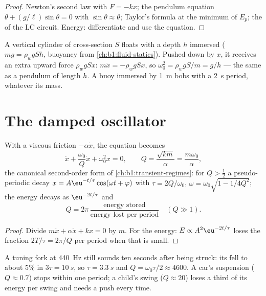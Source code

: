 \begin{proof}
Newton's second law with $F = -kx$; the pendulum equation
$\ddot\theta + (g/\ell)\sin\theta = 0$ with $\sin\theta \approx \theta$;
Taylor's formula at the minimum of $E_p$; the  of the LC
circuit. Energy: differentiate and use the equation.
\end{proof}

\begin{example}\label{ex:b1:oscillators-resonance:bob}
A vertical cylinder of cross-section $S$ floats with a depth $h$
immersed ($mg = \rho_wgSh$, buoyancy from \cref{ch:b1:fluid-statics}).
Pushed down by $x$, it receives an extra upward force $\rho_wgSx$:
$m\ddot x = -\rho_wgSx$, so $\omega_0^2 = \rho_wgS/m = g/h$ --- the same
as a pendulum of length $h$. A buoy immersed by \qty{1}{m} bobs with a
\qty{2}{s} period, whatever its mass.
\end{example}

\section{The damped oscillator}

\begin{proposition}\label{prop:b1:oscillators-resonance:damped}
With a viscous friction $-\alpha\dot x$, the equation becomes
\[
\ddot x + \frac{\omega_0}{Q}\dot x + \omega_0^2x = 0, \qquad
Q = \frac{\sqrt{km}}{\alpha} = \frac{m\omega_0}{\alpha},
\]
the canonical second-order form of \cref{ch:b1:transient-regimes}: for
$Q > \tfrac12$ a pseudo-periodic decay $x = A\eu^{-t/\tau}\cos(\omega t +
\varphi)$ with $\tau = 2Q/\omega_0$, $\omega = \omega_0\sqrt{1 - 1/4Q^2}$; the
energy decays as $\eu^{-2t/\tau}$ and
\[
Q = 2\pi\,\frac{\text{energy stored}}{\text{energy lost per period}}
\quad (Q \gg 1) .
\]
\end{proposition}

\begin{proof}
Divide $m\ddot x + \alpha\dot x + kx = 0$ by $m$. For the energy: $E
\propto A^2\eu^{-2t/\tau}$ loses the fraction $2T/\tau = 2\pi/Q$ per
period when that is small.
\end{proof}

\begin{example}\label{ex:b1:oscillators-resonance:ringing}
A tuning fork at \qty{440}{Hz} still sounds ten seconds after being
struck: its  fell to about $5\%$ in $3\tau = \qty{10}{s}$, so
$\tau = \qty{3.3}{s}$ and $Q = \omega_0\tau/2 \approx 4600$. A car's
suspension ($Q \approx 0.7$) stops within one period; a child's swing
($Q \approx 20$) loses a third of its energy per swing and needs a push
every time.
\end{example}

